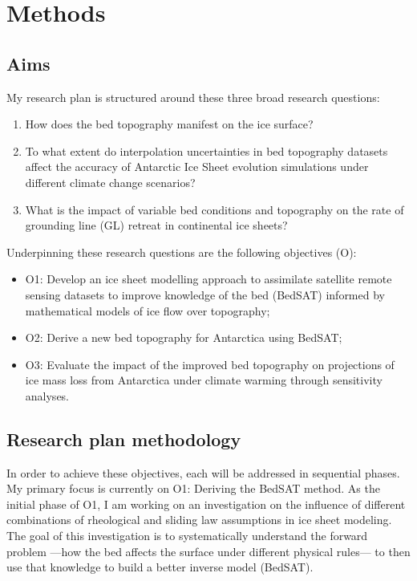\chapter{Methods}
\section{Aims}
 My research plan is structured around these three broad research questions:
\begin{enumerate}
    \item How does the bed topography manifest on the ice surface?
    \item To what extent do interpolation uncertainties in bed topography datasets affect the accuracy of Antarctic Ice Sheet evolution simulations under different climate change scenarios?
    \item What is the impact of variable bed conditions and topography on the rate of grounding line (GL) retreat in continental ice sheets?
\end{enumerate}
Underpinning these research questions are the following objectives (O):
\begin{itemize}
    \item{O1:} Develop an ice sheet modelling approach to assimilate satellite remote sensing datasets to improve knowledge of the bed (BedSAT) informed by mathematical models of ice flow over topography;
    \item{O2:} Derive a new bed topography for Antarctica using BedSAT;
    \item{O3:} Evaluate the impact of the improved bed topography on projections of ice mass loss from Antarctica under climate warming through sensitivity analyses. 
\end{itemize}

\section{Research plan methodology}
In order to achieve these objectives, each will be addressed in sequential phases. My primary focus is currently on O1: Deriving the BedSAT method. As the initial phase of O1, I am working on an investigation on the influence of different combinations of rheological and sliding law assumptions in ice sheet modeling. The goal of this investigation is to systematically understand the forward problem —how the bed affects the surface under different physical rules— to then use that knowledge to build a better inverse model (BedSAT).

